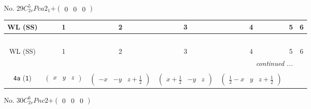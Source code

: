 \documentclass[fleqn,9pt,landscape]{jsarticle}
\begin{document}
\newpage
No. 29\quad$C_{2v}^{5}$\quad$Pca2_1$\quad[ orthorhombic ]\quad$+\begin{pmatrix} 0 & 0 & 0 \end{pmatrix}$
\begin{center}
\renewcommand{\arraystretch}{1.2}
\begin{longtable}{ccccccc}
 \hline \hline
WL (SS) & 1 & 2 & 3 & 4 & 5 & 6 \\ \hline \endfirsthead

\multicolumn{6}{l}{\tablename\ \thetable{}} \\
 \hline \hline
WL (SS) & 1 & 2 & 3 & 4 & 5 & 6 \\ \hline \endhead

 \hline \hline
\multicolumn{6}{r}{\footnotesize\it continued ...} \\ \endfoot

 \hline \hline
\multicolumn{6}{r}{} \\ \endlastfoot

{\tt 4a} ({\tt 1}) & $ \begin{pmatrix} x & y & z \end{pmatrix} $ & $ \begin{pmatrix} - x & - y & z + \frac{1}{2} \end{pmatrix} $ & $ \begin{pmatrix} x + \frac{1}{2} & - y & z \end{pmatrix} $ & $ \begin{pmatrix} \frac{1}{2} - x & y & z + \frac{1}{2} \end{pmatrix} $ \\
\end{longtable}
\end{center}
\newpage
No. 30\quad$C_{2v}^{6}$\quad$Pnc2$\quad[ orthorhombic ]\quad$+\begin{pmatrix} 0 & 0 & 0 \end{pmatrix}$
\end{document}

